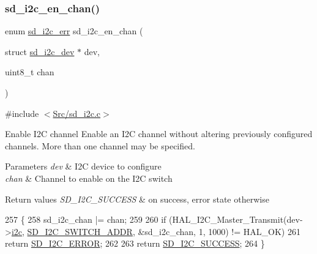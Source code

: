 \subsubsection{\texorpdfstring{sd\+\_\+i2c\+\_\+en\+\_\+chan()}{sd\_i2c\_en\_chan()}}
{\footnotesize\ttfamily enum \mbox{\hyperlink{group___s_d___i2_c___types_gae1e3131e61bdef08371262ffb4948a04}{sd\+\_\+i2c\+\_\+err}} sd\+\_\+i2c\+\_\+en\+\_\+chan (\begin{DoxyParamCaption}\item[{struct \mbox{\hyperlink{structsd__i2c__dev}{sd\+\_\+i2c\+\_\+dev}} $\ast$}]{dev,  }\item[{uint8\+\_\+t}]{chan }\end{DoxyParamCaption})}



{\ttfamily \#include $<$\mbox{\hyperlink{sd__i2c_8c}{Src/sd\+\_\+i2c.\+c}}$>$}



Enable I2C channel Enable an I2C channel without altering previously configured channels. More than one channel may be specified. 


\begin{DoxyParams}{Parameters}
{\em dev} & I2C device to configure \\
\hline
{\em chan} & Channel to enable on the I2C switch \\
\hline
\end{DoxyParams}

\begin{DoxyRetVals}{Return values}
{\em S\+D\+\_\+\+I2\+C\+\_\+\+S\+U\+C\+C\+E\+SS} & on success, error state otherwise \\
\hline
\end{DoxyRetVals}

\begin{DoxyCode}
257 \{
258     sd\_i2c\_chan |= chan;
259     
260     \textcolor{keywordflow}{if} (HAL\_I2C\_Master\_Transmit(dev->\mbox{\hyperlink{structsd__i2c__dev_a23e125244a7e27ff9ccc31b3b8495cfe}{i2c}}, \mbox{\hyperlink{group___s_d___i2_c___defines_gacb76170cf42752cd56acf4d1221e57da}{SD\_I2C\_SWITCH\_ADDR}}, &sd\_i2c\_chan, 1, 1000) 
      != HAL\_OK)
261         \textcolor{keywordflow}{return} \mbox{\hyperlink{group___s_d___i2_c___types_ggae1e3131e61bdef08371262ffb4948a04a8c2d0ed2a4601d3eede97f9c09510bcf}{SD\_I2C\_ERROR}};
262     
263     \textcolor{keywordflow}{return} \mbox{\hyperlink{group___s_d___i2_c___types_ggae1e3131e61bdef08371262ffb4948a04a8ac753d592892daa8d2f9109c59b884b}{SD\_I2C\_SUCCESS}};
264 \}
\end{DoxyCode}
\mbox{\label{group___s_d___i2_c___functions_ga6bd934690e906815d10e8812be1b5215}} 
